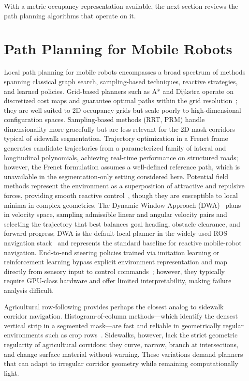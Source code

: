 \documentclass[12pt,letterpaper,oneside]{report}
\begin{document}
With a metric occupancy representation available, the next section reviews the path planning algorithms that operate on it.


\section{Path Planning for Mobile Robots}
\label{sec:lit_planning}

Local path planning for mobile robots encompasses a broad spectrum of methods spanning classical graph search, sampling-based techniques, reactive strategies, and learned policies. Grid-based planners such as A* and Dijkstra operate on discretized cost maps and guarantee optimal paths within the grid resolution~\cite{thrun2005probabilistic, lavalle2006}; they are well suited to 2D occupancy grids but scale poorly to high-dimensional configuration spaces. Sampling-based methods (RRT, PRM) handle dimensionality more gracefully but are less relevant for the 2D mask corridors typical of sidewalk segmentation. Trajectory optimization in a Frenet frame~\cite{werling2010frenet} generates candidate trajectories from a parameterized family of lateral and longitudinal polynomials, achieving real-time performance on structured roads; however, the Frenet formulation assumes a well-defined reference path, which is unavailable in the segmentation-only setting considered here. Potential field methods represent the environment as a superposition of attractive and repulsive forces, providing smooth reactive control~\cite{khatib1986}, though they are susceptible to local minima in complex geometries. The Dynamic Window Approach (DWA)~\cite{dwa_fox1997} plans in velocity space, sampling admissible linear and angular velocity pairs and selecting the trajectory that best balances goal heading, obstacle clearance, and forward progress; DWA is the default local planner in the widely used ROS navigation stack~\cite{quigley2009ros} and represents the standard baseline for reactive mobile-robot navigation. End-to-end steering policies trained via imitation learning or reinforcement learning bypass explicit environment representation and map directly from sensory input to control commands~\cite{e2e_nav_policies, bojarski2016}; however, they typically require GPU-class hardware and offer limited interpretability, making failure analysis difficult.

Agricultural row-following provides perhaps the closest analog to sidewalk corridor navigation. Histogram-of-column methods---which identify the densest vertical strip in a segmented mask---are fast and reliable in geometrically regular environments such as crop rows~\cite{orchard_seg_nav, row_nav_survey}. Sidewalks, however, lack the strict geometric regularity of agricultural corridors: they curve, narrow, branch at intersections, and change surface material without warning. These variations demand planners that can adapt to irregular corridor geometry while remaining computationally light.
\end{document}
